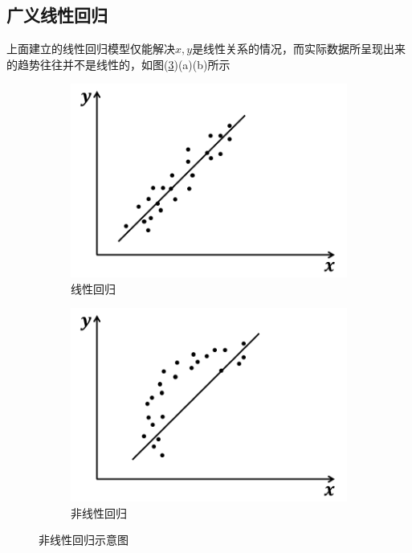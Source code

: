     \subsection{广义线性回归}
        \par
        上面建立的线性回归模型仅能解决$x,y$是线性关系的情况，而实际数据所呈现出来的趋势往往并不是线性的，如图(\ref{fig:非线性回归示意图})(a)(b)所示
\begin{figure}[H]
    \centering
    \begin{subfigure}[b]{0.35\textwidth}
        \includegraphics[width=\textwidth]{images/Non_linear_regression1.jpg}
        \caption{线性回归}
        \label{fig:线性回归}
    \end{subfigure}
    \begin{subfigure}[b]{0.35\textwidth}
        \includegraphics[width=\textwidth]{images/Non_linear_regression2.jpg}
        \caption{非线性回归}
        \label{fig:非线性回归}
    \end{subfigure}
    \caption{非线性回归示意图}\label{fig:非线性回归示意图}
\end{figure}
